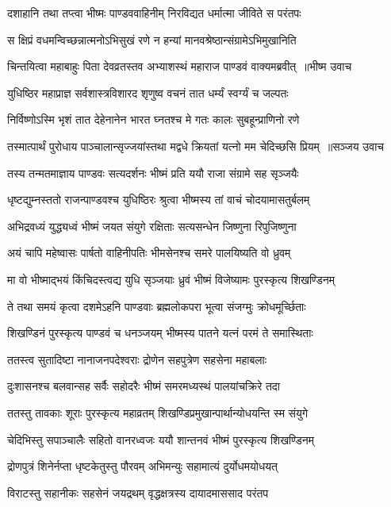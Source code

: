 \twolineshloka
{दशाहानि तथा तप्त्वा भीष्मः पाण्डववाहिनीम्}
{निरविद्यत धर्मात्मा जीविते स परंतपः}


\twolineshloka
{स क्षिप्रं वधमन्विच्छन्नात्मनोऽभिसुखं रणे}
{न हन्यां मानवश्रेष्ठान्संग्रामेऽभिमुखानिति}


\threelineshloka
{चिन्तयित्वा महाबाहुः पिता देवव्रतस्तव}
{अभ्याशस्थं महाराज पाण्डवं वाक्यमब्रवीत् ॥भीष्म उवाच}
{}


\twolineshloka
{युधिष्ठिर महाप्राज्ञ सर्वशास्त्रविशारद}
{शृणुष्व वचनं तात धर्म्यं स्वर्ग्यं च जल्पतः}


\twolineshloka
{निर्विष्णोऽस्मि भृशं तात देहेनानेन भारत}
{घ्नतश्च मे गतः कालः सुबहून्प्राणिनो रणे}


\threelineshloka
{तस्मात्पार्थं पुरोधाय पाञ्चालान्सृज्जयांस्तथा}
{मद्वधे क्रियतां यत्नो मम चेदिच्छसि प्रियम् ॥सञ्जय उवाच}
{}


\twolineshloka
{तस्य तन्मतमाज्ञाय पाण्डवः सत्यदर्शनः}
{भीष्मं प्रति ययौ राजा संग्रामे सह सृञ्जयैः}


\twolineshloka
{धृष्टद्युम्नस्ततो राजन्पाण्डवश्च युधिष्ठिरः}
{श्रुत्वा भीष्मस्य तां वाचं चोदयामासतुर्बलम्}


\twolineshloka
{अभिद्रवध्यं युद्ध्यध्वं भीष्मं जयत संयुगे}
{रक्षिताः सत्यसन्धेन जिष्णुना रिपुजिष्णुना}


\twolineshloka
{अयं चापि महेष्वासः पार्षतो वाहिनीपतिः}
{भीमसेनश्च समरे पालयिष्यति वो ध्रुवम्}


\twolineshloka
{मा वो भीष्माद्भयं किंचिदस्त्वद्य युधि सृञ्जयाः}
{ध्रुवं भीष्मं विजेष्यामः पुरस्कृत्य शिखण्डिनम्}


\twolineshloka
{ते तथा समयं कृत्वा दशमेऽहनि पाण्डवाः}
{ब्रह्मलोकपरा भूत्वा संजग्मुः क्रोधमूर्च्छिताः}


\twolineshloka
{शिखण्डिनं पुरस्कृत्य पाण्डवं च धनञ्जयम्}
{भीष्मस्य पातने यत्नं परमं ते समास्थिताः}


\twolineshloka
{ततस्त्व सुतादिष्टा नानाजनपदेश्वराः}
{द्रोणेन सहपुत्रेण सहसेना महाबलाः}


\twolineshloka
{दुःशासनश्च बलवान्सह सर्वैः सहोदरैः}
{भीष्मं समरमध्यस्थं पालयांचक्रिरे तदा}


\twolineshloka
{ततस्तु तावकाः शूराः पुरस्कृत्य महाव्रतम्}
{शिखण्डिप्रमुखान्पार्थान्योधयन्ति स्म संयुगे}


\twolineshloka
{चेदिभिस्तु सपाञ्चालैः सहितो वानरध्वजः}
{ययौ शान्तनवं भीष्मं पुरस्कृत्य शिखण्डिनम्}


\twolineshloka
{द्रोणपुत्रं शिनेर्नप्ता धृष्टकेतुस्तु पौरवम्}
{अभिमन्युः सहामात्यं दुर्योधमयोधयत्}


\twolineshloka
{विराटस्तु सहानीकः सहसेनं जयद्रथम्}
{वृद्धक्षत्रस्य दायादमाससाद परंतप}


